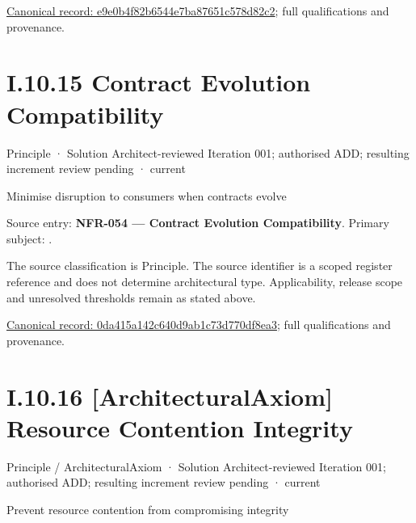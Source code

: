 {\footnotesize \href{../../../../continuum/motivation/principle/architectural-axiom/e9e0b4f82b6544e7ba87651c578d82c2.md}{Canonical record: e9e0b4f82b6544e7ba87651c578d82c2}; full qualifications and provenance.}\par
\section*{I.10.15 Contract Evolution Compatibility}
\label{navigation:I.10.15}

\label{element:0da415a142c640d9ab1c73d770df8ea3}
{\small Principle · Solution Architect-reviewed Iteration 001; authorised ADD; resulting increment review pending · current}\par

Minimise disruption to consumers when contracts evolve



Source entry: \textbf{NFR-054 — Contract Evolution Compatibility}. Primary subject: \texttt{}.



The source classification is Principle. The source identifier is a scoped register reference and does not determine architectural type. Applicability, release scope and unresolved thresholds remain as stated above.


{\footnotesize \href{../../../../continuum/motivation/principle/0da415a142c640d9ab1c73d770df8ea3.md}{Canonical record: 0da415a142c640d9ab1c73d770df8ea3}; full qualifications and provenance.}\par
\section*{I.10.16 [ArchitecturalAxiom] Resource Contention Integrity}
\label{navigation:I.10.16}

\label{element:db8d320dc4c0454080f8c0f3c4e52801}
{\small Principle / ArchitecturalAxiom · Solution Architect-reviewed Iteration 001; authorised ADD; resulting increment review pending · current}\par

Prevent resource contention from compromising integrity



